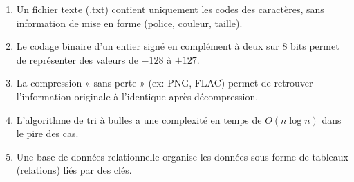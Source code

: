 \documentclass[11pt]{article}
\begin{document}
\begin{exercice}
\begin{enumerate}
    \item Un fichier texte (.txt) contient uniquement les codes des caractères, sans information de mise en forme (police, couleur, taille).
    \item Le codage binaire d'un entier signé en complément à deux sur 8 bits permet de représenter des valeurs de $-128$ à $+127$.
    \item La compression « sans perte » (ex: PNG, FLAC) permet de retrouver l'information originale à l'identique après décompression.
    \item L'algorithme de tri à bulles a une complexité en temps de $O(n \log n)$ dans le pire des cas.
    \item Une base de données relationnelle organise les données sous forme de tableaux (relations) liés par des clés.
\end{enumerate}
\end{exercice}
\end{document}
